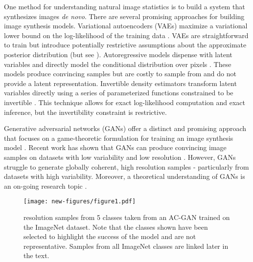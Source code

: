 \documentclass{article}
\begin{document}
One method for understanding natural image statistics
is to build a system that synthesizes
images \textit{de novo}.
There are several promising approaches for building image synthesis models.
Variational autoencoders (VAEs) maximize a variational lower bound
on the log-likelihood of the training data \citep{VAES, VAES2}.
VAEs are straightforward to train but
introduce potentially restrictive assumptions about the approximate
posterior distribution (but see \cite{NORMALIZINGFLOWS, IAF}).
Autoregressive models dispense with latent variables and directly model the conditional
distribution over pixels \citep{PIXELRNN, PIXELCNN}.
These models produce convincing samples but are costly to sample from
and do not provide a latent representation.
Invertible density estimators transform latent variables directly using a series of
parameterized functions constrained to be invertible \citep{nvp}.
This technique allows for exact log-likelihood computation and exact inference, but the invertibility constraint is restrictive.

Generative adversarial networks (GANs) offer a distinct and promising approach
that focuses on a game-theoretic formulation for training an image synthesis model \citep{GANS}.
Recent work has shown that GANs can produce convincing image samples on datasets with low variability and low resolution \citep{LAPGAN,DCGAN}.
However, GANs struggle to generate globally coherent, high resolution samples - 
particularly from datasets with high variability. Moreover, a theoretical understanding
of GANs is an on-going research topic \citep{THEORY1, THEORY2}.


\begin{figure*}[!t]
\hspace{-0.0\textwidth} \texttt{[image: new-figures/figure1.pdf]}\vspace{-5pt}
\caption{
   resolution samples from 5 classes taken from an AC-GAN trained on the ImageNet dataset.
  Note that the classes shown have been selected to highlight the success of the model and are not representative. Samples from all ImageNet classes are linked later in the text.\iffalse
  GAN samples from these classes achieve mean pair-wise MSSIM scores of
  0.29, 0.27, 0.31, 0.29, 0.28 and 0.16.
  When these samples are fed through a pre-trained Inception classifier,
  the classifier achieves mean accuracies of 0.76, 0.24, 0.3, 0.4, 0.48, and 0.09.
  See text for details.\fi}
\label{fig:imagenetsamples}
\end{figure*}
\end{document}
